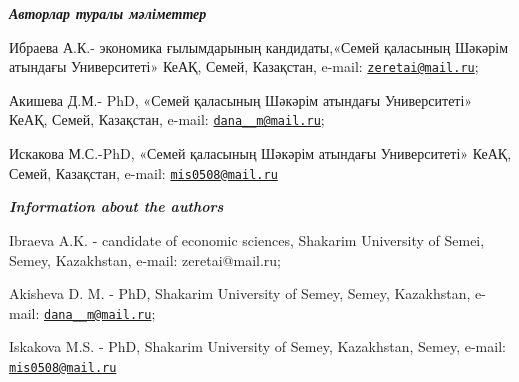 \begin{authorinfo}

\hspace{1em}\emph{{\bfseries Авторлар туралы мәліметтер}}

Ибраева А.К.- экономика ғылымдарының кандидаты,«Семей қаласының Шәкәрім
атындағы Университеті» КеАҚ, Семей, Казақстан, e-mail:
\href{mailto:ZEretai@mail.ru}{\nolinkurl{zeretai@mail.ru}};

Акишева Д.М.- PhD, «Семей қаласының Шәкәрім атындағы Университеті» КеАҚ,
Семей, Казақстан, \linebreak e-mail:
\href{mailto:dana__m@mail.ru}{\nolinkurl{dana\_\_m@mail.ru}};

Искакова М.С.-PhD, «Семей қаласының Шәкәрім атындағы Университеті» КеАҚ,
Семей, Казақстан, \linebreak e-mail:
\href{mailto:mis0508@mail.ru}{\nolinkurl{mis0508@mail.ru}}

\hspace{1em}\emph{{\bfseries Information about the authors}}

Ibraeva A.K. - candidate of economic sciences, Shakarim University of
Semei, Semey, Kazakhstan, e-mail: zeretai@mail.ru;

Akisheva D. M. - PhD, Shakarim University of Semey, Semey, Kazakhstan,
e-mail: \href{mailto:dana__m@mail.ru}{\nolinkurl{dana\_\_m@mail.ru}};

Iskakova M.S. - PhD, Shakarim University of Semey, Kazakhstan, Semey,
e-mail: \href{mailto:mis0508@mail.ru}{\nolinkurl{mis0508@mail.ru}}
\end{authorinfo}
